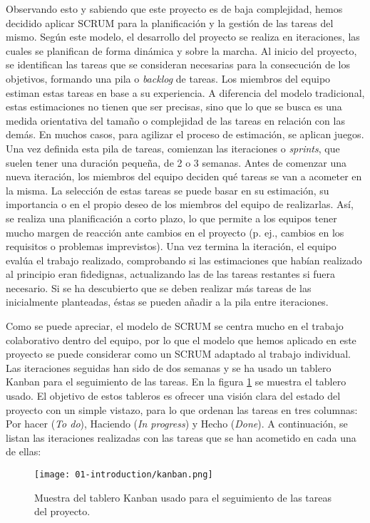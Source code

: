 Observando esto y sabiendo que este proyecto es de baja complejidad, hemos
decidido aplicar SCRUM para la planificación y la gestión de las tareas del
mismo. Según este modelo, el desarrollo del proyecto se realiza en iteraciones,
las cuales se planifican de forma dinámica y sobre la marcha. Al inicio del
proyecto, se identifican las tareas que se consideran necesarias para la
consecución de los objetivos, formando una pila o \textit{backlog} de tareas.
Los miembros del equipo estiman estas tareas en base a su experiencia. A
diferencia del modelo tradicional, estas estimaciones no tienen que ser
precisas, sino que lo que se busca es una medida orientativa del tamaño o
complejidad de las tareas en relación con las demás. En muchos casos, para
agilizar el proceso de estimación, se aplican juegos. Una vez definida esta pila
de tareas, comienzan las iteraciones o \textit{sprints}, que suelen tener una
duración pequeña, de 2 o 3 semanas. Antes de comenzar una nueva iteración, los
miembros del equipo deciden qué tareas se van a acometer en la misma. La
selección de estas tareas se puede basar en su estimación, su importancia o en
el propio deseo de los miembros del equipo de realizarlas. Así, se realiza una
planificación a corto plazo, lo que permite a los equipos tener mucho margen de
reacción ante cambios en el proyecto (p. ej., cambios en los requisitos o
problemas imprevistos). Una vez termina la iteración, el equipo evalúa el
trabajo realizado, comprobando si las estimaciones que habían realizado al
principio eran fidedignas, actualizando las de las tareas restantes si fuera
necesario. Si se ha descubierto que se deben realizar más tareas de las
inicialmente planteadas, éstas se pueden añadir a la pila entre iteraciones.

Como se puede apreciar, el modelo de SCRUM se centra mucho en el trabajo
colaborativo dentro del equipo, por lo que el modelo que hemos aplicado en este
proyecto se puede considerar como un SCRUM adaptado al trabajo individual. Las
iteraciones seguidas han sido de dos semanas y se ha usado un tablero Kanban
para el seguimiento de las tareas. En la figura \ref{fig:01-kanban} se muestra
el tablero usado. El objetivo de estos tableros es ofrecer una visión clara del
estado del proyecto con un simple vistazo, para lo que ordenan las tareas en
tres columnas: Por hacer (\textit{To do}), Haciendo (\textit{In progress}) y
Hecho (\textit{Done}). A continuación, se listan las iteraciones realizadas con
las tareas que se han acometido en cada una de ellas:

\begin{figure}
      \centering
      \texttt{[image: 01-introduction/kanban.png]}
      \caption{Muestra del tablero Kanban usado para el seguimiento de las tareas del proyecto.}
      \label{fig:01-kanban}
\end{figure}

